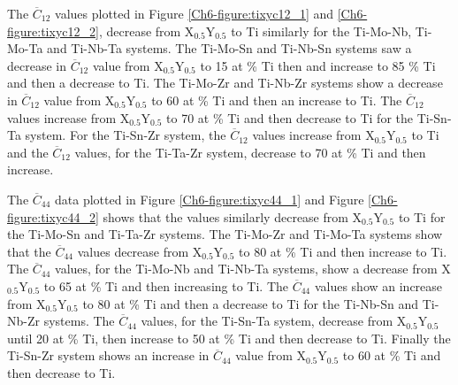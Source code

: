 The  $\overline{C}_{12}$ values plotted in Figure \ref{Ch6-figure:tixyc12_1} and \ref{Ch6-figure:tixyc12_2}, decrease from X$_{0.5}$Y$_{0.5}$ to Ti similarly for the Ti-Mo-Nb, Ti-Mo-Ta and Ti-Nb-Ta systems. The Ti-Mo-Sn and Ti-Nb-Sn systems saw a decrease in $\overline{C}_{12}$ value from X$_{0.5}$Y$_{0.5}$ to 15 at \% Ti then and increase to 85 \% Ti and then a decrease to Ti. The Ti-Mo-Zr and Ti-Nb-Zr systems show a decrease in $\overline{C}_{12}$ value from X$_{0.5}$Y$_{0.5}$ to 60 at \% Ti and then an increase to Ti. The $\overline{C}_{12}$ values increase from X$_{0.5}$Y$_{0.5}$ to 70 at \% Ti and then decrease to Ti for the Ti-Sn-Ta system. For the Ti-Sn-Zr system, the $\overline{C}_{12}$ values increase from X$_{0.5}$Y$_{0.5}$ to Ti and the $\overline{C}_{12}$ values, for the Ti-Ta-Zr system, decrease to 70 at \% Ti and then increase. 

The $\overline{C}_{44}$ data plotted in Figure \ref{Ch6-figure:tixyc44_1} and Figure \ref{Ch6-figure:tixyc44_2} shows that the values similarly decrease from X$_{0.5}$Y$_{0.5}$ to Ti for the Ti-Mo-Sn and Ti-Ta-Zr systems. The Ti-Mo-Zr and Ti-Mo-Ta systems show that the $\overline{C}_{44}$ values decrease from X$_{0.5}$Y$_{0.5}$ to 80 at \% Ti and then increase to Ti. The $\overline{C}_{44}$ values, for the Ti-Mo-Nb and Ti-Nb-Ta systems, show a decrease from X$_{0.5}$Y$_{0.5}$ to 65 at \% Ti and then increasing to Ti. The $\overline{C}_{44}$ values show an increase from X$_{0.5}$Y$_{0.5}$ to 80 at \% Ti and then a decrease to Ti for the Ti-Nb-Sn and Ti-Nb-Zr systems. The $\overline{C}_{44}$ values, for the Ti-Sn-Ta system, decrease from X$_{0.5}$Y$_{0.5}$ until 20 at \% Ti, then increase to 50 at \% Ti and then decrease to Ti. Finally the Ti-Sn-Zr system shows an increase in $\overline{C}_{44}$ value from X$_{0.5}$Y$_{0.5}$ to 60 at \% Ti and then decrease to Ti. 

